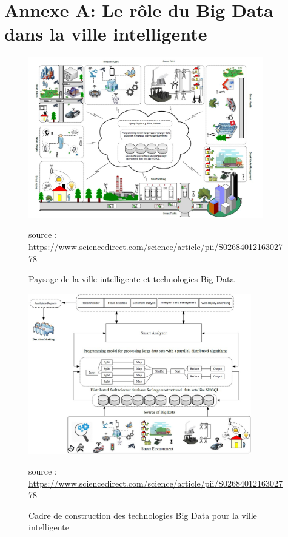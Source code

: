 \documentclass[french, a4paper, 12pt]{report}
\begin{document}
\chapter{Annexe A: Le rôle du Big Data dans la ville intelligente}
\label{annexeA}
\begin{figure}[!htb]
    \centering
    \includegraphics[height=7cm]{images/BD1.jpg}
    \caption{Paysage de la ville intelligente et technologies Big Data }
    \scriptsize{\small source : \url{https://www.sciencedirect.com/science/article/pii/S0268401216302778}}
    \label{fig:annexeA1}
\end{figure}
\begin{figure}[!htb]
    \centering
    \includegraphics[height=7cm]{images/BD2.jpg}
    \caption{Cadre de construction des technologies Big Data pour la ville intelligente}
    \scriptsize{\small source : \url{https://www.sciencedirect.com/science/article/pii/S0268401216302778}}
    \label{fig:annexeA2}
\end{figure}
\end{document}
